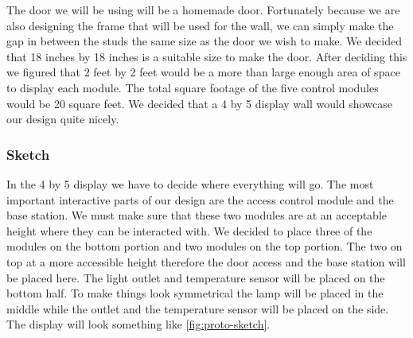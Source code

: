The door we will be using will be a homemade door. Fortunately
because we are also designing the frame that will be used for the wall, we can
simply make the gap in between the studs the same size as the door we wish to
make. We decided that 18 inches by 18 inches is a suitable size to make the
door. After deciding this we figured that 2 feet by 2 feet would be a more than
large enough area of space to display each module. The total square footage of
the five control modules would be 20 square feet. We decided that a 4 by 5
display wall would showcase our design quite nicely.

\subsubsection{Sketch} In the 4 by 5 display we have to decide where everything
will go. The most important interactive parts of our design are the access
control module and the base station. We must make sure that these two modules
are at an acceptable height where they can be interacted with. We decided to
place three of the modules on the bottom portion and two modules on the top
portion. The two on top at a more accessible height therefore the door access
and the base station will be placed here. The light outlet and temperature
sensor will be placed on the bottom half. To make things look symmetrical the
lamp will be placed in the middle while the outlet and the temperature sensor
will be placed on the side. The display will look something like \autoref{fig:proto-sketch}.

